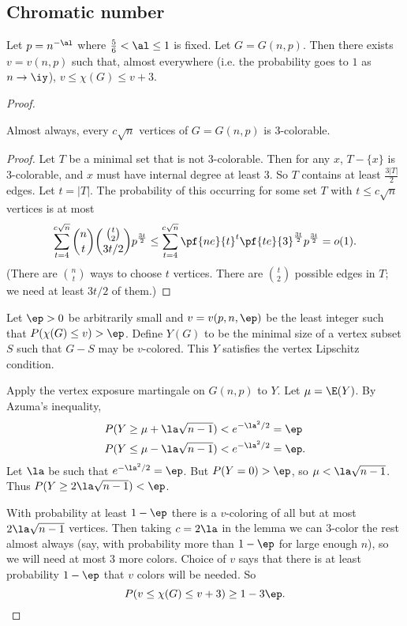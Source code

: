 
\subsection{Chromatic number}
\begin{thm}
Let $p=n^{-\al}$ where $\frac 56<\al\le 1$ is fixed. Let $G=G(n,p)$. Then there exists $v=v(n,p)$ such that, almost everywhere (i.e. the probability goes to $1$ as $n\to \iy$), $v\le \chi(G)\le v+3$.
\end{thm}
\begin{proof}
\begin{lem} Almost always, every $c\sqrt n$ vertices of $G=G(n,p)$ is 3-colorable.
\end{lem}
\begin{proof}
Let $T$ be a minimal set that is not 3-colorable. Then for any $x$, $T-\{x\}$ is 3-colorable, and $x$ must have internal degree at least 3. So $T$ contains at least $\frac{3|T|}{2}$ edges. Let $t=|T|$. The probability of this occurring for some set $T$ with $t\le c\sqrt n$ vertices is at most
\begin{equation}\label{l13-1}
\sum_{t=4}^{c\sqrt n} \binom nt \binom{\binom t2}{3t/2}p^{\frac{3t}2}
\le \sum_{t=4}^{c\sqrt n} \pf{ne}{t}^t \pf{te}{3}^{\frac{3t}2}p^{\frac{3t}2}=o(1).
\end{equation}
(There are $\binom nt$ ways to choose $t$ vertices.
There are $\binom t2$ possible edges in $T$; we need at least $3t/2$ of them.)
\end{proof}
Let $\ep>0$ be arbitrarily small and $v=v(p,n,\ep)$ be the least integer such that $P(\chi(G)\le v)>\ep$. 
Define $Y(G)$ to be the minimal size of a vertex subset $S$ such that $G-S$ may be $v$-colored. This $Y$ satisfies the vertex Lipschitz condition.

Apply the vertex exposure martingale on $G(n,p)$ to $Y$. Let $\mu=\E(Y)$. By Azuma's inequality,
\begin{align*}
P(Y\ge \mu+\la \sqrt{n-1})&<e^{-\la^2/2}=\ep\\
P(Y\le \mu- \la \sqrt{n-1})&<e^{-\la^2/2}=\ep.
\end{align*}
Let $\la$ be such that $e^{-\la^2/2}=\ep$. But $P(Y=0)>\ep$, so $\mu<\la \sqrt{n-1}$. Thus $P(Y\ge 2\la \sqrt{n-1})<\ep$. 

With probability at least $1-\ep$ there is a $v$-coloring of all but at most $2\la \sqrt{n-1}$ vertices. Then taking $c=2\la$ in the lemma we can 3-color the rest almost always (say, with probability more than $1-\ep$ for large enough $n$), so we will need at most 3 more colors. Choice of $v$ says that there is at least probability $1-\ep$ that $v$ colors will be needed.
So
\[
P(v\le \chi(G)\le v+3)\ge 1-3\ep.
\]
\end{proof}

